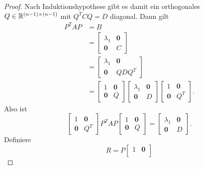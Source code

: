 \begin{proof}
    Nach Induktionshypothese gibt es damit ein orthogonales \(Q \in \mathbb{R}^{(n-1)\times(n-1)}\) mit \(Q^{T}CQ = D\) diagonal. 
    Dann gilt
    \begin{align*}
        P^{T}AP &= B \\
        &= 
        \begin{bmatrix}
            {\lambda}_1 & \symbf{0} \\
            \symbf{0} & C
        \end{bmatrix} \\
        &=
        \begin{bmatrix}
            {\lambda}_1 & \symbf{0} \\
            \symbf{0} & QDQ^{T}
        \end{bmatrix} \\
        &=
        \begin{bmatrix}
            1 & \symbf{0} \\
            \symbf{0} & Q
        \end{bmatrix}
        \begin{bmatrix}
            {\lambda}_1 & \symbf{0} \\
            \symbf{0} & D
        \end{bmatrix}
        \begin{bmatrix}
            1 & \symbf{0} \\
            \symbf{0} & Q^{T}
        \end{bmatrix}.
    \end{align*}
    Also ist
    \begin{equation*}
        \begin{bmatrix}
            1 & \symbf{0} \\
            \symbf{0} & Q^{T}
        \end{bmatrix}
        P^{T}AP
        \begin{bmatrix}
            1 & \symbf{0} \\
            \symbf{0} & Q
        \end{bmatrix}
        =
        \begin{bmatrix}
            {\lambda}_1 & \symbf{0} \\
            \symbf{0} & D
        \end{bmatrix}.
    \end{equation*} 
    Definiere
    \begin{equation*}
        R = P
        \begin{bmatrix}
            1 & \symbf{0} \\

\end{bmatrix}
\end{equation*}
\end{proof}
